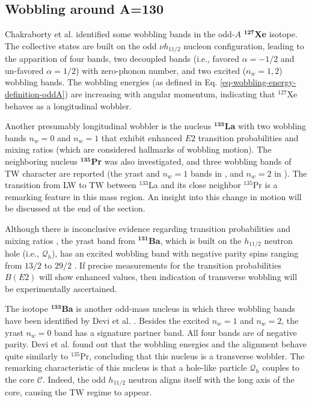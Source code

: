 \subsection{Wobbling around A=130}

Chakraborty et al. \cite{chakraborty2020multiphonon} identified some wobbling bands in the odd-$A$ $^\mathbf{127}$\textbf{Xe} isotope. The collective states are built on the odd $\nu h_{11/2}$ nucleon configuration, leading to the apparition of four bands, two decoupled bands (i.e., favored $\alpha=-1/2$ and un-favored $\alpha=1/2$) with zero-phonon number, and two excited ($n_w=1,2$) wobbling bands. The wobbling energies (as defined in Eq. \ref{eq-wobbling-energy-definition-oddA}) are increasing with angular momentum, indicating that $^{127}$Xe behaves as a longitudinal wobbler. 

Another presumably longitudinal wobbler is the nucleus $^\mathbf{133}$\textbf{La} \cite{biswas2019longitudinal} with two wobbling bands $n_w=0$ and $n_w=1$ that exhibit enhanced $E2$ transition probabilities and mixing ratios (which are considered hallmarks of wobbling motion). The neighboring nucleus $^\mathbf{135}$\textbf{Pr} was also investigated, and three wobbling bands of TW character are reported (the yrast and $n_w=1$ bands in \cite{matta2017transverse}, and $n_w=2$ in \cite{sensharma2019two}). 
The transition from LW to TW between $^{133}$La and its close neighbor $^{135}$Pr is a remarking feature in this mass region. An insight into this change in motion will be discussed at the end of the section. 

Although there is inconclusive evidence regarding transition probabilities and mixing ratios \cite{ma1990competing,kaur2014high}, the yrast band from $^\mathbf{131}$\textbf{Ba}, which is built on the $h_{11/2}$ neutron hole (i.e., $\mathcal{Q}_h$), has an excited wobbling band with negative parity spins ranging from $13/2$ to $29/2$ \cite{petrache_2018}. If precise measurements for the transition probabilities $B(E2)$ will show enhanced values, then indication of transverse wobbling will be experimentally ascertained.

The isotope $^\mathbf{133}$\textbf{Ba} is another odd-mass nucleus in which three wobbling bands have been identified by Devi et al. \cite{devi2021observation}. Besides the excited $n_w=1$ and $n_w=2$, the yrast $n_w=0$ band has a signature partner band. All four bands are of negative parity. Devi et al. found out that the wobbling energies and the alignment behave quite similarly to $^{135}$Pr, concluding that this nucleus is a transverse wobbler. The remarking characteristic of this nucleus is that a hole-like particle $\mathcal{Q}_h$ couples to the core $\mathscr{C}$. Indeed, the odd $h_{11/2}$ neutron aligns itself with the long axis of the core, causing the TW regime to appear.

